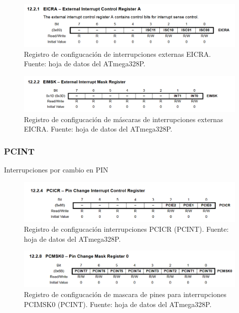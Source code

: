     \begin{figure}[H]
    \centering
    \includegraphics[width=\linewidth]{./Anexos/Marco Teorico/External Interrupts/EICRA.png}
    \caption{Registro de configucación de interrupciones externas EICRA. Fuente: hoja de datos del ATmega328P\@\cite{atmega328p_datasheet}.}
    \label{fig:EICRA}
    \end{figure}

    \begin{figure}[H]
    \centering
    \includegraphics[width=\linewidth]{./Anexos/Marco Teorico/External Interrupts/EIMSK.png}
    \caption{Registro de configucación de máscaras de interrupciones externas EICRA. Fuente: hoja de datos del ATmega328P\@\cite{atmega328p_datasheet}.}
    \label{fig:EIMSK}
    \end{figure}

    \subsubsection{PCINT}
    Interrupciones por cambio en PIN


    \begin{figure}[H]
    \centering
    \includegraphics[width=\linewidth]{./Anexos/Marco Teorico/External Interrupts/PCICR.png}
    \caption{Registro de configucación interrupciones PCICR (PCINT). Fuente: hoja de datos del ATmega328P\@\cite{atmega328p_datasheet}.}
    \label{fig:PCICR}
    \end{figure}

    \begin{figure}[H]
    \centering
    \includegraphics[width=\linewidth]{./Anexos/Marco Teorico/External Interrupts/PCMSK.png}
    \caption{Registro de configucación de mascara de pines para interrupciones PCIMSK0 (PCINT). Fuente: hoja de datos del ATmega328P\@\cite{atmega328p_datasheet}.}
    \label{fig:PCIMSK}
    \end{figure}

